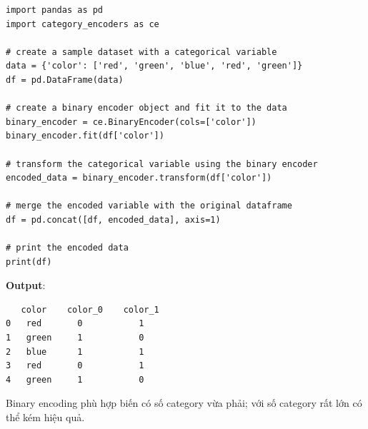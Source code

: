 \begin{vidu}[title={Ví dụ Binary Encoding với category\_encoders}]
\begin{lstlisting}
import pandas as pd
import category_encoders as ce

# create a sample dataset with a categorical variable
data = {'color': ['red', 'green', 'blue', 'red', 'green']}
df = pd.DataFrame(data)

# create a binary encoder object and fit it to the data
binary_encoder = ce.BinaryEncoder(cols=['color'])
binary_encoder.fit(df['color'])

# transform the categorical variable using the binary encoder
encoded_data = binary_encoder.transform(df['color'])

# merge the encoded variable with the original dataframe
df = pd.concat([df, encoded_data], axis=1)

# print the encoded data
print(df)
\end{lstlisting}

\textbf{Output}:
\begin{lstlisting}
   color    color_0    color_1
0   red       0           1
1   green     1           0
2   blue      1           1
3   red       0           1
4   green     1           0
\end{lstlisting}
\end{vidu}

\begin{luuy}[title={Phạm vi áp dụng}]
Binary encoding phù hợp biến có số category vừa phải; với số category rất lớn có thể kém hiệu quả.
\end{luuy}
